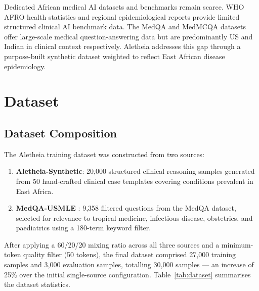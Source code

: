 \documentclass[journal]{IEEEtran}
\begin{document}
Dedicated African medical AI datasets and benchmarks remain scarce.
WHO AFRO health statistics \cite{afrihealth2023} and regional
epidemiological reports provide limited structured clinical AI benchmark data. The MedQA \cite{jin2021medqa} and
MedMCQA \cite{pmlr-v174-pal22a} datasets offer large-scale medical
question-answering data but are predominantly US and Indian in
clinical context respectively. Aletheia addresses this gap through
a purpose-built synthetic dataset weighted to reflect East African
disease epidemiology.

\section{Dataset}
\label{sec:dataset}

\subsection{Dataset Composition}

The Aletheia training dataset was constructed from two sources:

\begin{enumerate}
  \item \textbf{Aletheia-Synthetic}: 20{,}000 structured clinical
        reasoning samples generated from 50 hand-crafted clinical
        case templates covering conditions prevalent in East Africa.
  \item \textbf{MedQA-USMLE} \cite{jin2021medqa}: 9{,}358 filtered
        questions from the MedQA dataset, selected for relevance to
        tropical medicine, infectious disease, obstetrics, and
        paediatrics using a 180-term keyword filter.
\end{enumerate}

After applying a 60/20/20 mixing ratio across all three sources
and a minimum-token quality filter (50 tokens), the final dataset
comprised 27{,}000 training samples and 3{,}000 evaluation samples,
totalling 30{,}000 samples --- an increase of 25\% over the
initial single-source configuration.
Table~\ref{tab:dataset} summarises the dataset statistics.
\end{document}
